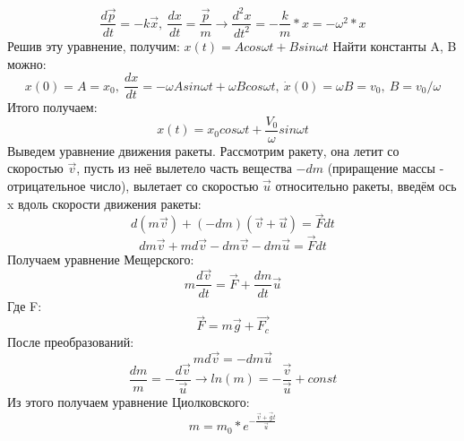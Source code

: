  \[\frac{d\vec{p}}{dt} = -k\vec{x}, \ \frac{dx}{dt} = \frac{\vec{p}}{m} \rightarrow \frac{d^2x}{dt^2} = -\frac{k}{m} * x = -\omega^2 * x\]
 Решив эту уравнение, получим: $x(t) = Acos\omega t + Bsin\omega t$
 \newline Найти константы A, B можно: 
 \[x(0) = A = x_0, \ \frac{dx}{dt} = -\omega Asin\omega t + \omega Bcos\omega t, \ \dot x(0) = \omega B = v_0, \ B = v_0/\omega\]
 Итого получаем:
 \[x(t) = x_0cos\omega t + \frac{V_0}{\omega}sin\omega t\]
 Выведем уравнение движения ракеты.
 \newline Рассмотрим ракету, она летит со скоростью $\vec{v}$, пусть из неё вылетело часть вещества $-dm$ (приращение массы - отрицательное число), вылетает со скоростью $\vec{u}$ относительно ракеты, введём ось x вдоль скорости движения ракеты:
 \[d(m\vec{v}) + (-dm)(\vec{v} + \vec{u}) = \vec{F}dt\]
 \[dm\vec{v} + md\vec{v} - dm\vec{v} - dm\vec{u} = \vec{F}dt\]
 Получаем уравнение Мещерского:
 \[m\frac{d\vec{v}}{dt} = \vec{F} + \frac{dm}{dt}\vec{u}\]
 Где F:
 \[\vec{F} = m\vec{g} + \vec{F_c}\]
 После преобразований:
 \[md\vec{v} = -dm\vec{u}\]
 \[\frac{dm}{m} = - \frac{d\vec{v}}{\vec{u}} \rightarrow ln(m) = -\frac{\vec{v}}{\vec{u}} + const\]
 Из этого получаем уравнение Циолковского:
 \[m = m_0 * e^{-\frac{\vec{v} + \vec{g}t}{\vec{u}}}\]